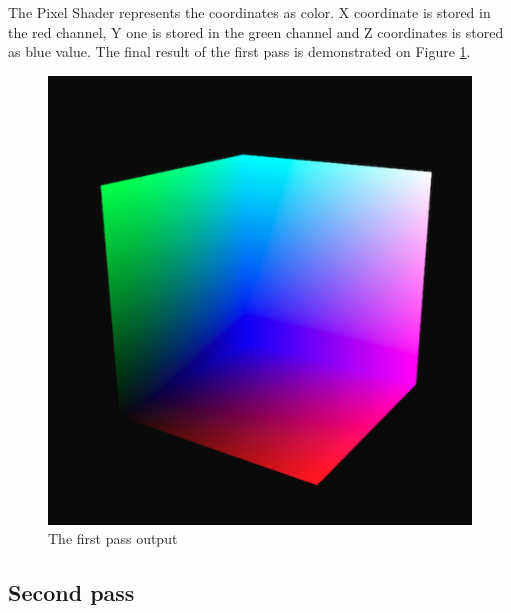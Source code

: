 \documentclass[twoside, english, 11pt]{report}
\begin{document}
The Pixel Shader represents the coordinates as color. X coordinate is stored in the red channel, Y one is stored in the green channel and Z coordinates is stored as blue value. The final result of the first pass is demonstrated on Figure \ref{fig:first}.
\begin{figure}[!h]
\centerline{\includegraphics[scale = 0.5]{img/first}}
\caption{The first pass output\label{fig:first}}
\end{figure}

\subsection{Second pass}
\end{document}
